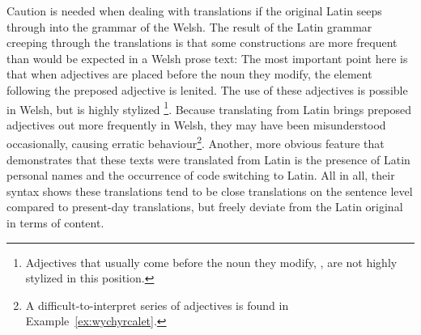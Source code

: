 Caution is needed when dealing with translations if the  original Latin seeps through into the grammar of the Welsh.
The result of the Latin grammar creeping through the translations is that some constructions are more frequent than would be expected in a Welsh prose text:
The most important point here is that when adjectives are placed before the noun they modify, the element following the preposed adjective is lenited.
The use of these adjectives is possible in Welsh, but is highly stylized%
\footnote{Adjectives that usually come before the noun they modify, \eg {}, are not highly stylized in this position.}.
Because translating from Latin brings preposed adjectives out more frequently in Welsh, they may have been misunderstood occasionally, causing erratic behaviour\footnote{A difficult-to-interpret series of adjectives is found in Example~\ref{ex:wychyrcalet}.}.
Another, more obvious feature that demonstrates that  these texts were translated from Latin is the presence of Latin personal names and the occurrence of code switching to Latin.  
All in all, their syntax shows these translations tend to be close translations on the sentence level compared to present-day translations, but freely deviate from the Latin original in terms of content. 

